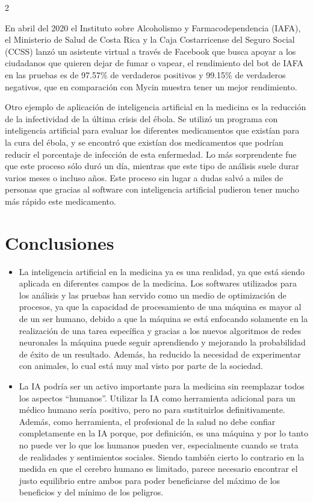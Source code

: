 \documentclass[12pt,spanish,Letterpaper,openany]{book}
\begin{document}
\begin {multicols}{2}
\begin {flushleft}
\begin{minipage}[c]{\columnwidth}
\end{minipage}
\end {flushleft}

En abril del 2020 el Instituto sobre Alcoholismo y Farmacodependencia (IAFA), el Ministerio de Salud de Costa Rica y la Caja Costarricense del Seguro Social (CCSS) lanzó un asistente virtual a través de Facebook que busca apoyar a los ciudadanos que quieren dejar de fumar o vapear, el rendimiento del bot de IAFA en las pruebas es de 97.57\% de verdaderos positivos y 99.15\% de verdaderos negativos, que en comparación con Mycin muestra tener un mejor rendimiento.

Otro ejemplo de aplicación de inteligencia artificial en la medicina es la reducción de la infectividad de la última crisis del ébola. Se utilizó un programa con inteligencia artificial para evaluar los diferentes medicamentos que existían para la cura del ébola, y se encontró que existían dos medicamentos que podrían reducir el porcentaje de infección de esta enfermedad. Lo más sorprendente fue que este proceso sólo duró un día, mientras que este tipo de análisis suele durar varios meses o incluso años. Este proceso sin lugar a dudas salvó a miles de personas que gracias al software con inteligencia artificial pudieron tener mucho más rápido este medicamento.

\hypertarget{conclusiones}{%
\section{Conclusiones}\label{conclusiones}}

\begin{itemize}
\item
  La inteligencia artificial en la medicina ya es una realidad, ya que está siendo aplicada en diferentes campos de la medicina. Los softwares utilizados para los análisis y las pruebas han servido como un medio de optimización de procesos, ya que la capacidad de procesamiento de una máquina es mayor al de un ser humano, debido a que la máquina se está enfocando solamente en la realización de una tarea específica y gracias a los nuevos algoritmos de redes neuronales la máquina puede seguir aprendiendo y mejorando la probabilidad de éxito de un resultado. Además, ha reducido la necesidad de experimentar con animales, lo cual está muy mal visto por parte de la sociedad.
\item
  La IA podría ser un activo importante para la medicina sin reemplazar todos los aspectos ``humanos''. Utilizar la IA como herramienta adicional para un médico humano sería positivo, pero no para sustituirlos definitivamente. Además, como herramienta, el profesional de la salud no debe confiar completamente en la IA porque, por definición, es una máquina y por lo tanto no puede ver lo que los humanos pueden ver, especialmente cuando se trata de realidades y sentimientos sociales. Siendo también cierto lo contrario en la medida en que el cerebro humano es limitado, parece necesario encontrar el justo equilibrio entre ambos para poder beneficiarse del máximo de los beneficios y del mínimo de los peligros.
\end{itemize}


\end{multicols}
\end{document}
